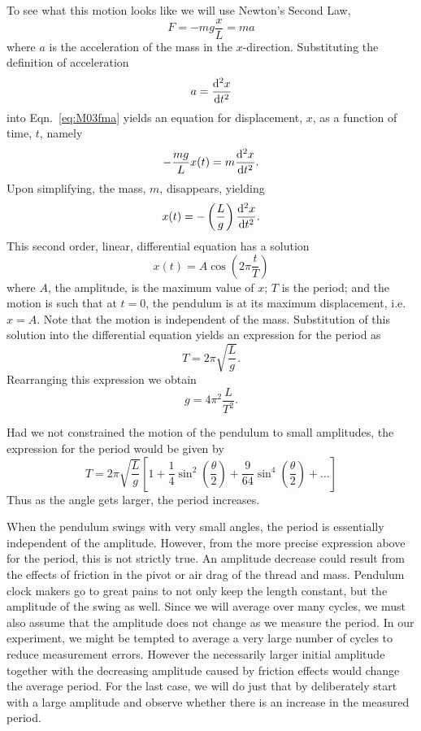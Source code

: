 To see what this motion looks like we will use Newton's Second Law,
\begin{equation}
  \label{eq:M03fma}
  F = -m g \frac{x}{L} = m a
\end{equation}
where $a$ is the acceleration of the mass in the $x$-direction.
Substituting the definition of acceleration
\[
a = \frac{{\rm d}^2 x}{{\rm d} t^{2}}
\]
into Eqn.~\ref{eq:M03fma} yields an equation for displacement, $x$, as a function of time, $t$, namely
\[
-\frac{mg}{L} x(t) = m \frac{{\rm d}^2 x}{{\rm d} t^{2}}.
\]
Upon simplifying, the mass, $m$, disappears, yielding
\[
x(t) = -\left(\frac{L}{g}\right) \frac{{\rm d}^2 x}{{\rm d} t^{2}}.
\]
This second order, linear, differential equation has a solution
\[
x(t) = A \cos\left(2\pi \frac{t}{T} \right)
\]
where $A$, the amplitude, is the maximum value of $x$; $T$ is the period; and the motion is such that at $t = 0$, the pendulum is at its maximum displacement, i.e.\ $x = A$.  Note that the motion is independent of the mass.  Substitution of this solution into the differential equation yields an expression for the period as
\begin{equation}
  \label{eq:M03CalcTime}
  T = 2\pi \sqrt{\frac{L}{g}}.
\end{equation}
Rearranging this expression we obtain
\begin{equation}
  \label{eq:M03Calcg}
  g = 4\pi^2 \frac{L}{T^2}.
\end{equation}

Had we not constrained the motion of the pendulum to small amplitudes, the expression for the period would be given by
\begin{equation}
\label{eq:M03PeriodSeries_pendulum}
T = 2\pi \sqrt{\frac{L}{g}}  \left[ 1 +
  \frac{1}{ 4} \sin^2\left(\frac{\theta}{2}\right) +
  \frac{9}{64} \sin^4\left(\frac{\theta}{2}\right) + \ldots \right]
\end{equation}
Thus as the angle gets larger, the period increases.

When the pendulum swings with very small angles, the period is essentially independent of the amplitude.  However, from the more precise expression above for the period, this is not strictly true.  An amplitude decrease could result from the effects of friction in the pivot or air drag of the thread and mass.  Pendulum clock makers go to great pains to not only keep the length constant, but the amplitude of the swing as well.  Since we will average over many cycles, we must also assume that the amplitude does not change as we measure the period.  In our experiment, we might be tempted to average a very large number of cycles to reduce measurement errors.  However the necessarily larger initial amplitude together with the decreasing amplitude caused by friction effects would change the average period.  For the last case, we will do just that by deliberately start with a large amplitude and observe whether there is an increase in the measured period.

